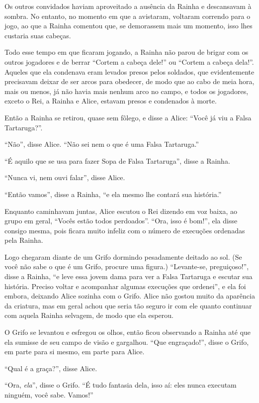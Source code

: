 Os outros convidados haviam aproveitado a ausência da Rainha e
descansavam à sombra. No entanto, no momento em que a avistaram,
voltaram correndo para o jogo, ao que a Rainha comentou que, se
demorassem mais um momento, isso lhes custaria suas cabeças.

Todo esse tempo em que ficaram jogando, a Rainha não parou de brigar com
os outros jogadores e de berrar ``Cortem a cabeça dele!'' ou ``Cortem
a cabeça dela!''. Aqueles que ela condenava eram levados presos pelos
soldados, que evidentemente precisavam deixar de ser arcos para
obedecer, de modo que ao cabo de meia hora, mais ou menos, já não havia
mais nenhum arco no campo, e todos os jogadores, exceto o Rei, a Rainha
e Alice, estavam presos e condenados à morte.

Então a Rainha se retirou, quase sem fôlego, e disse a Alice: ``Você já
viu a Falsa Tartaruga?''.

``Não'', disse Alice. ``Não sei nem o que é uma Falsa Tartaruga.''

``É aquilo que se usa para fazer Sopa de Falsa Tartaruga'', disse a
Rainha.

``Nunca vi, nem ouvi falar'', disse Alice.

``Então vamos'', disse a Rainha, ``e ela mesmo lhe contará sua
história.''

Enquanto caminhavam juntas, Alice escutou o Rei dizendo em voz baixa, ao
grupo em geral, ``Vocês estão todos perdoados''. ``Ora, isso é bom!'',
ela disse consigo mesma, pois ficara muito infeliz com o número de
execuções ordenadas pela Rainha.

Logo chegaram diante de um Grifo dormindo pesadamente deitado ao sol.
(Se você não sabe o que é um Grifo, procure uma figura.) ``Levante-se,
preguiçoso!'', disse a Rainha, ``e leve essa jovem dama para ver a Falsa
Tartaruga e escutar sua história. Preciso voltar e acompanhar algumas
execuções que ordenei'', e ela foi embora, deixando Alice sozinha com o
Grifo. Alice não gostou muito da aparência da criatura, mas em geral
achou que seria tão seguro ir com ele quanto continuar com aquela Rainha
selvagem, de modo que ela esperou.

O Grifo se levantou e esfregou os olhos, então ficou observando a
Rainha até que ela sumisse de seu campo de visão e gargalhou.
``Que engraçado!'', disse o Grifo, em parte para si mesmo, em parte para
Alice.

``Qual é a graça?'', disse Alice.

``Ora, \emph{ela}'', disse o Grifo. ``É tudo fantasia dela, isso aí:
eles nunca executam ninguém, você sabe. Vamos!''

